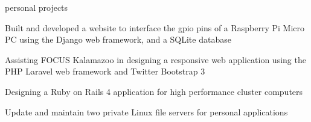 \documentclass{resume} %
\begin{document}
\begin{rSection}{personal projects}

\begin{rSublist}
\item Built and developed a website to interface the gpio pins of a Raspberry Pi Micro PC using the Django web framework, and a SQLite database
\item Assisting FOCUS Kalamazoo in designing a responsive web application using the PHP Laravel web framework and Twitter Bootstrap 3
\item Designing a Ruby on Rails 4 application for high performance cluster computers
\item Update and maintain two private Linux file servers for personal applications
\end{rSublist}



\end{rSection}
\end{document}
